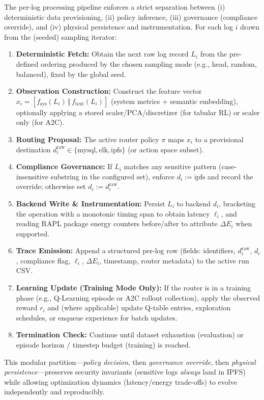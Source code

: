 The per-log processing pipeline enforces a strict separation between (i) deterministic data provisioning, (ii) policy inference, (iii) governance (compliance override), and (iv) physical persistence and instrumentation. For each log $i$ drawn from the (seeded) sampling iterator:
\begin{enumerate}
  \item \textbf{Deterministic Fetch:} Obtain the next raw log record $L_i$ from the pre-defined ordering produced by the chosen sampling mode (e.g., head, random, balanced), fixed by the global seed.
  \item \textbf{Observation Construction:} Construct the feature vector $x_i = [f_{\text{sys}}(L_i) \,\Vert\, f_{\text{text}}(L_i)]$ (system metrics + semantic embedding), optionally applying a stored scaler/PCA/discretizer (for tabular RL) or scaler only (for A2C).
  \item \textbf{Routing Proposal:} The active router policy $\pi$ maps $x_i$ to a provisional destination $d_i^{\text{raw}} \in \{\text{mysql}, \text{elk}, \text{ipfs}\}$ (or action space subset).
  \item \textbf{Compliance Governance:} If $L_i$ matches any sensitive pattern (case-insensitive substring in the configured set), enforce $d_i := \text{ipfs}$ and record the override; otherwise set $d_i := d_i^{\text{raw}}$.
  \item \textbf{Backend Write \& Instrumentation:} Persist $L_i$ to backend $d_i$, bracketing the operation with a monotonic timing span to obtain latency $\ell_i$, and reading RAPL package energy counters before/after to attribute $\Delta E_i$ when supported.
  \item \textbf{Trace Emission:} Append a structured per-log row (fields: identifiers, $d_i^{\text{raw}}$, $d_i$, compliance flag, $\ell_i$, $\Delta E_i$, timestamp, router metadata) to the active run CSV.
  \item \textbf{Learning Update (Training Mode Only):} If the router is in a training phase (e.g., Q-Learning episode or A2C rollout collection), apply the observed reward $r_i$ and (where applicable) update Q-table entries, exploration schedules, or enqueue experience for batch updates.
  \item \textbf{Termination Check:} Continue until dataset exhaustion (evaluation) or episode horizon / timestep budget (training) is reached.
\end{enumerate}
This modular partition---\emph{policy decision}, then \emph{governance override}, then \emph{physical persistence}---preserves security invariants (sensitive logs \emph{always} land in IPFS) while allowing optimization dynamics (latency/energy trade-offs) to evolve independently and reproducibly.


